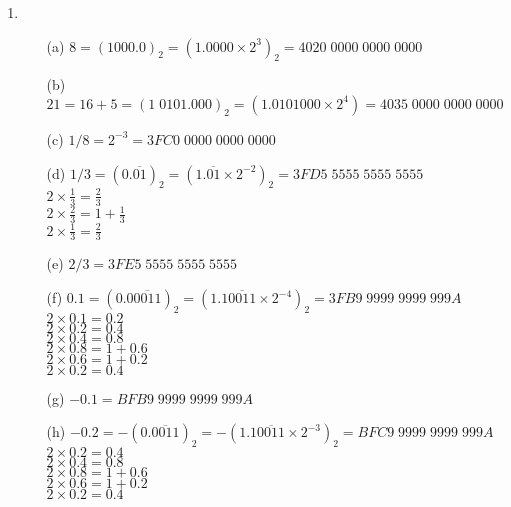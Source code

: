 \documentclass[UTF8]{ctexart}
\begin{document}
\begin{enumerate}
\begin{itemize}
\end{itemize}

\item \begin{itemize}
\item[(a)] $8 = (1000.0)_2 = (1.0000 \times 2^3)_2 = 4020\;0000\;0000\;0000$
\item[(b)] $21 = 16 + 5 = (1\;0101.000)_2 = (1.0101000 \times 2^4) = 4035\;0000\;0000\;0000$
\item[(c)] $1/8 = 2^{-3} = 3FC0\;0000\;0000\;0000$
\item[(d)] $1/3 = (0.\overline{01})_2 = (1.\overline{01} \times 2^{-2})_2 = 3FD5\;5555\;5555\;5555$ \\
$2 \times \frac{1}{3} = \frac{2}{3}$ \\
$2 \times \frac{2}{3} = 1 + \frac{1}{3}$ \\
$2 \times \frac{1}{3} = \frac{2}{3}$
\item[(e)] $2/3 = 3FE5\;5555\;5555\;5555$
\item[(f)] $0.1 = (0.0\overline{0011})_2 = (1.1\overline{0011} \times 2^{-4})_2 = 3FB9\;9999\;9999\;999A$ \\
$2 \times 0.1 = 0.2$ \\
$2 \times 0.2 = 0.4$ \\
$2 \times 0.4 = 0.8$ \\
$2 \times 0.8 = 1 + 0.6$ \\
$2 \times 0.6 = 1 + 0.2$ \\
$2 \times 0.2 = 0.4$
\item[(g)] $-0.1 = BFB9\;9999\;9999\;999A$
\item[(h)] $-0.2 = -(0.\overline{0011})_2 = -(1.1\overline{0011} \times 2^{-3})_2 = BFC9\;9999\;9999\;999A $ \\
$2 \times 0.2 = 0.4$ \\
$2 \times 0.4 = 0.8$ \\
$2 \times 0.8 = 1 + 0.6$ \\
$2 \times 0.6 = 1 + 0.2$ \\
$2 \times 0.2 = 0.4$

\end{itemize}


\end{enumerate}
\end{document}
